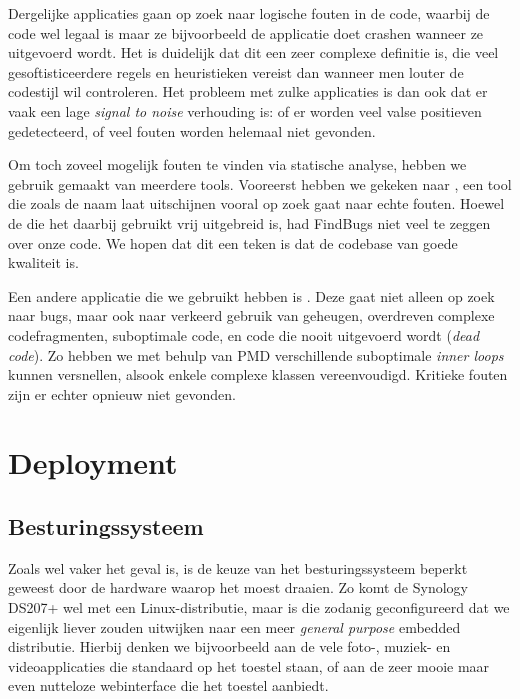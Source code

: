 Dergelijke applicaties gaan op zoek naar logische fouten in de code, waarbij de code wel legaal is maar ze bijvoorbeeld de applicatie doet crashen wanneer ze uitgevoerd wordt. Het is duidelijk dat dit een zeer complexe definitie is, die veel gesoftisticeerdere regels en heuristieken vereist dan wanneer men louter de codestijl wil controleren. Het probleem met zulke applicaties is dan ook dat er vaak een lage \emph{signal to noise} verhouding is: of er worden veel valse positieven gedetecteerd, of veel fouten worden helemaal niet gevonden.

Om toch zoveel mogelijk fouten te vinden via statische analyse, hebben we gebruik gemaakt van meerdere tools. Vooreerst hebben we gekeken naar , een tool die zoals de naam laat uitschijnen vooral op zoek gaat naar echte fouten. Hoewel de  die het daarbij gebruikt vrij uitgebreid is, had FindBugs niet veel te zeggen over onze code. We hopen dat dit een teken is dat de codebase van goede kwaliteit is.

Een andere applicatie die we gebruikt hebben is . Deze gaat niet alleen op zoek naar bugs, maar ook naar verkeerd gebruik van geheugen, overdreven complexe codefragmenten, suboptimale code, en code die nooit uitgevoerd wordt (\emph{dead code}). Zo hebben we met behulp van PMD verschillende suboptimale \emph{inner loops} kunnen versnellen, alsook enkele complexe klassen vereenvoudigd. Kritieke fouten zijn er echter opnieuw niet gevonden.

\chapter{Deployment}
\label{server:deployment}

\section{Besturingssysteem}
\label{server:deployment:besturingssysteem}

Zoals wel vaker het geval is, is de keuze van het besturingssysteem beperkt geweest door de hardware waarop het moest draaien. Zo komt de Synology DS207+ wel met een Linux-distributie, maar is die zodanig geconfigureerd dat we eigenlijk liever zouden uitwijken naar een meer \emph{general purpose} embedded distributie. Hierbij denken we bijvoorbeeld aan de vele foto-, muziek- en videoapplicaties die standaard op het toestel staan, of aan de zeer mooie maar even nutteloze webinterface die het toestel aanbiedt.

